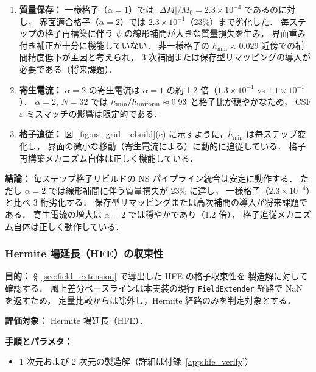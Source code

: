 \begin{enumerate}[noitemsep]
  \item \textbf{質量保存：}
        一様格子（$\alpha = 1$）では $|\Delta M|/M_0 = 2.3 \times 10^{-4}$ であるのに対し，
        界面適合格子（$\alpha = 2$）では $2.3 \times 10^{-1}$（23\%）まで劣化した．
        毎ステップの格子再構築に伴う $\psi$ の線形補間が大きな質量損失を生み，
        界面重み付き補正が十分に機能していない．
        非一様格子の $h_{\min} \approx 0.029$ 近傍での補間精度低下が主因と考えられ，
        3 次補間または保存型リマッピングの導入が必要である（将来課題）．
  \item \textbf{寄生電流：}
        $\alpha = 2$ の寄生電流は $\alpha = 1$ の約 1.2 倍（$1.3 \times 10^{-1}$ vs $1.1 \times 10^{-1}$）．
        $\alpha = 2$, $N = 32$ では $h_{\min}/h_{\rm uniform} \approx 0.93$ と格子比が穏やかなため，
        CSF $\varepsilon$ ミスマッチの影響は限定的である．
  \item \textbf{格子追従：}
        図~\ref{fig:ns_grid_rebuild}(c) に示すように，$h_{\min}$ は毎ステップ変化し，
        界面の微小な移動（寄生電流による）に動的に追従している．
        格子再構築メカニズム自体は正しく機能している．
\end{enumerate}

\noindent\textbf{結論：}
毎ステップ格子リビルドの NS パイプライン統合は安定に動作する．
ただし $\alpha = 2$ では線形補間に伴う質量損失が 23\% に達し，
一様格子（$2.3 \times 10^{-4}$）と比べ 3 桁劣化する．
保存型リマッピングまたは高次補間の導入が将来課題である．
寄生電流の増大は $\alpha = 2$ では穏やかであり（1.2 倍），
格子追従メカニズム自体は正しく動作している．


\subsubsection{Hermite 場延長（HFE）の収束性}
\label{sec:verify_field_extension}%
\label{sec:verify_gfm}%

\noindent\textbf{目的：}
§~\ref{sec:field_extension} で導出した HFE の格子収束性を
製造解に対して確認する．
風上差分ベースラインは本実装の現行 \texttt{FieldExtender} 経路で NaN を返すため，
定量比較からは除外し，Hermite 経路のみを判定対象とする．

\noindent\textbf{評価対象：}
Hermite 場延長（HFE）．

\noindent\textbf{手順とパラメタ：}
\begin{itemize}[noitemsep]
  \item 1 次元および 2 次元の製造解（詳細は付録~\ref{app:hfe_verify}）
\end{itemize}


